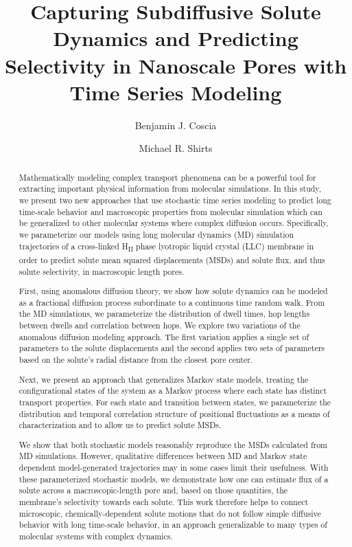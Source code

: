 \documentclass[journal=jctcce,manuscript=article]{achemso}
\title{Capturing Subdiffusive Solute Dynamics and Predicting Selectivity in Nanoscale Pores with Time Series Modeling}
\author{Benjamin J. Coscia}
\affiliation{Department of Chemical and Biological Engineering, University of Colorado Boulder, Boulder, CO 80309, USA}
\author{Michael R. Shirts}
\affiliation{Department of Chemical and Biological Engineering, University of Colorado Boulder, Boulder, CO 80309, USA}
\begin{document}
  
  \begin{abstract}
  
  Mathematically modeling complex transport phenomena can be a powerful tool
  for extracting important physical information from molecular simulations. 
  In this study, we present two new approaches that use stochastic time series
  modeling to predict long time-scale behavior and macroscopic properties 
  from molecular simulation which can be generalized to other molecular systems
  where complex diffusion occurs. Specifically, we parameterize our models using
  long molecular dynamics (MD) simulation trajectories of a cross-linked 
  H\textsubscript{II} phase lyotropic liquid crystal (LLC) membrane in order to
  predict solute mean squared displacements (MSDs) and solute flux, and thus 
  solute selectivity, in macroscopic length pores.

  First, using anomalous diffusion theory, we show how solute dynamics can be
  modeled as a fractional diffusion process subordinate to a continuous time 
  random walk. From the MD simulations, we parameterize the distribution of 
  dwell times, hop lengths between dwells and correlation between hops. We 
  explore two variations of the anomalous diffusion modeling approach. The first 
  variation applies a single set of parameters to the solute displacements and 
  the second applies two sets of parameters based on the solute's radial distance
  from the closest pore center. 

  Next, we present an approach that generalizes Markov state models, treating 
  the configurational states of the system as a Markov process where each 
  state has distinct transport properties. For each state and transition between
  states, we parameterize the distribution and temporal correlation structure of
  positional fluctuations as a means of characterization and to allow us to
  predict solute MSDs. 
 
  We show that both stochastic models reasonably reproduce the MSDs calculated 
  from MD simulations. However, qualitative differences between MD and Markov 
  state dependent model-generated trajectories may in some cases limit their 
  usefulness. With these parameterized stochastic models, we demonstrate how 
  one can estimate flux of a solute across a macroscopic-length pore and, based
  on those quantities, the membrane's selectivity towards each solute. This
  work therefore helps to connect microscopic, chemically-dependent solute 
  motions that do not follow simple diffusive behavior with long time-scale 
  behavior, in an approach generalizable to many types of molecular systems 
  with complex dynamics.

  \end{abstract}
\end{document}
